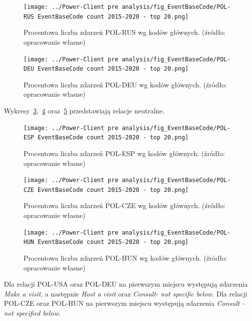 \documentclass[11pt]{report}
\begin{document}
    \begin{figure}[!htp]
        \centering
        \texttt{[image: ../Power-Client pre analysis/fig\_EventBaseCode/POL-RUS EventBaseCode count 2015-2020 - top 20.png]}
        \caption{Procentowa liczba zdarzeń POL-RUS wg kodów głównych. (źródło: opracowanie własne)}
        \label{fig:Power-Client:EBC:POL-RUS}
    \end{figure}

    \begin{figure}[!htp]
        \centering
        \texttt{[image: ../Power-Client pre analysis/fig\_EventBaseCode/POL-DEU EventBaseCode count 2015-2020 - top 20.png]}
        \caption{Procentowa liczba zdarzeń POL-DEU wg kodów głównych. (źródło: opracowanie własne)}
        \label{fig:Power-Client:EBC:POL-DEU}
    \end{figure}

    Wykresy~\ref{fig:Power-Client:EBC:POL-ESP},~\ref{fig:Power-Client:EBC:POL-CZE} oraz~\ref{fig:Power-Client:EBC:POL-HUN} przedstawiają relacje neutralne.
    \begin{figure}[!htp]
        \centering
        \texttt{[image: ../Power-Client pre analysis/fig\_EventBaseCode/POL-ESP EventBaseCode count 2015-2020 - top 20.png]}
        \caption{Procentowa liczba zdarzeń POL-ESP wg kodów głównych. (źródło: opracowanie własne)}
        \label{fig:Power-Client:EBC:POL-ESP}
    \end{figure}

    \begin{figure}[!htp]
        \centering
        \texttt{[image: ../Power-Client pre analysis/fig\_EventBaseCode/POL-CZE EventBaseCode count 2015-2020 - top 20.png]}
        \caption{Procentowa liczba zdarzeń POL-CZE wg kodów głównych. (źródło: opracowanie własne)}
        \label{fig:Power-Client:EBC:POL-CZE}
    \end{figure}

    \begin{figure}[!htp]
        \centering
        \texttt{[image: ../Power-Client pre analysis/fig\_EventBaseCode/POL-HUN EventBaseCode count 2015-2020 - top 20.png]}
        \caption{Procentowa liczba zdarzeń POL-HUN wg kodów głównych. (źródło: opracowanie własne)}
        \label{fig:Power-Client:EBC:POL-HUN}
    \end{figure}

    Dla relacji POL-USA oraz POL-DEU na pierwszym miejscu występują zdarzenia \textit{Make a visit}, a następnie
    \textit{Host a visit} oraz \textit{Consult- not specific below}.
    Dla relacji POL-CZE oraz POL-HUN na pierwszym miejscu występują zdarzenia \textit{Consult - not specified below}.
\end{document}
